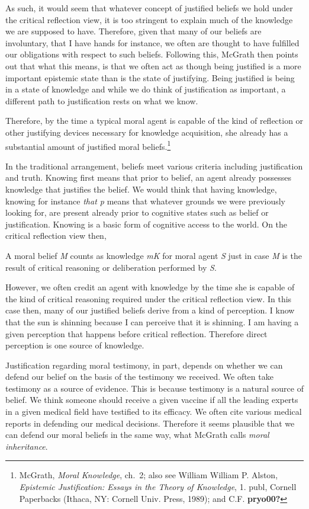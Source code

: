 \documentclass[phdthesis,12pt,final]{wuthesis}
\theoremstyle{definition}
\theoremstyle{definition}
\theoremstyle{definition}
\theoremstyle{definition}
\theoremstyle{remark}
\begin{document}
As such, it would seem that whatever concept of justified beliefs we hold under the critical reflection view, it is too stringent to explain much of the knowledge we are supposed to have. Therefore, given that many of our beliefs are involuntary, that I have hands for instance, we often are thought to have fulfilled our obligations with respect to such beliefs. Following this, McGrath then points out that what this means, is that we often act as though being justified is a more important epistemic state than is the state of justifying. Being justified is being in a state of knowledge and while we do think of justification as important, a different path to justification rests on what we know.

Therefore, by the time a typical moral agent is capable of the kind of reflection or other justifying devices necessary for knowledge acquisition, she already has a substantial amount of justified moral beliefs.\footnote{McGrath, \emph{Moral {Knowledge}}, ch.~2; also see William William P. Alston, \emph{Epistemic Justification: Essays in the Theory of Knowledge}, 1. publ, Cornell Paperbacks (Ithaca, NY: Cornell Univ. Press, 1989); and C.F. \textbf{pryo00?}}

In the traditional arrangement, beliefs meet various criteria including justification and truth. Knowing first means that prior to belief, an agent already possesses knowledge that justifies the belief. We would think that having knowledge, knowing for instance \emph{that p} means that whatever grounds we were previously looking for, are present already prior to cognitive states such as belief or justification. Knowing is a basic form of cognitive access to the world. On the critical reflection view then,

A moral belief \emph{M} counts as knowledge \emph{mK} for moral agent \emph{S} just in case \emph{M} is the result of critical reasoning or deliberation performed by \emph{S}.

However, we often credit an agent with knowledge by the time she is capable of the kind of critical reasoning required under the critical reflection view. In this case then, many of our justified beliefs derive from a kind of perception. I know that the sun is shinning because I can perceive that it is shinning. I am having a given perception that happens before critical reflection. Therefore direct perception is one source of knowledge.

Justification regarding moral testimony, in part, depends on whether we can defend our belief on the basis of the testimony we received. We often take testimony as a source of evidence. This is because testimony is a natural source of belief. We think someone should receive a given vaccine if all the leading experts in a given medical field have testified to its efficacy. We often cite various medical reports in defending our medical decisions. Therefore it seems plausible that we can defend our moral beliefs in the same way, what McGrath calls \emph{moral inheritance}.
\end{document}
